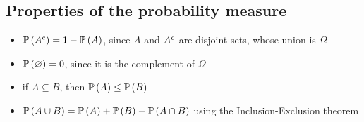 \subsection{Properties of the probability measure}
\begin{itemize}
	\item \(\mathbb{P}\left({{A}^c}\right) = 1 - \mathbb{P}\left({A}\right)\), since \(A\) and \({A}^c\) are disjoint sets, whose union is \(\Omega\)
	\item \(\mathbb{P}\left({\varnothing}\right) = 0\), since it is the complement of \(\Omega\)
	\item if \(A \subseteq B\), then \(\mathbb{P}\left({A}\right) \leq \mathbb{P}\left({B}\right)\)
	\item \(\mathbb{P}\left({A \cup B}\right) = \mathbb{P}\left({A}\right) + \mathbb{P}\left({B}\right) - \mathbb{P}\left({A \cap B}\right)\) using the Inclusion-Exclusion theorem
\end{itemize}

